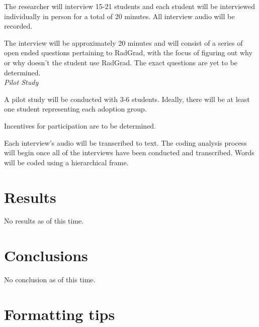 \documentclass[english]{proposalnsf}
\begin{document}
The researcher will interview 15-21 students and each student will be interviewed individually in person for a total of 20 minutes. All interview audio will be recorded. 
 
The interview will be approximately 20 minutes and will consist of a series of open ended questions pertaining to RadGrad, with the focus of figuring out why or why doesn't the student use RadGrad. The exact questions are yet to be determined.  
\\ 
{\em Pilot Study}

A pilot study will be conducted with 3-6 students. Ideally, there will be at least one student representing each adoption group. 

Incentives for participation are to be determined.

Each interview's audio will be transcribed to text. The coding analysis process will begin once all of the interviews have been conducted and transcribed. Words will be coded using a hierarchical frame.  
\\

\section{Results}
\label{results}

No results as of this time.

\section{Conclusions}
\label{conclusions}

No conclusion as of this time.




\appendix
\section{Formatting tips}
\end{document}
